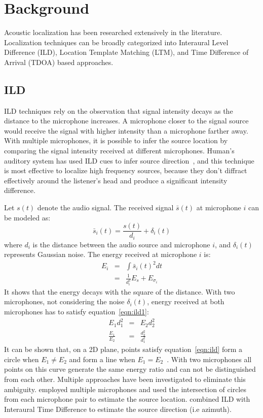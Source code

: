 \chapter{Background}
Acoustic localization has been researched extensively in the literature. Localization techniques can be broadly categorized into Interaural Level Difference (ILD), Location Template Matching (LTM), and Time Difference of Arrival (TDOA) based approaches.

\section{ILD}
ILD techniques rely on the observation that signal intensity decays as the distance to the microphone increases. A microphone closer to the signal source would receive the signal with higher intensity than a microphone farther away. With multiple microphones, it is possible to infer the source location by comparing the signal intensity received at different microphones. Human's auditory system has used ILD cues to infer source direction~\cite{ild:2}, and this technique is most effective to localize high frequency sources, because they don't diffract effectively around the listener's head and produce a significant intensity difference.

Let $s(t)$ denote the audio signal. The received signal $\bar s(t) $ at microphone $i$ can be modeled as:
\[
\bar s_i(t) = \frac{s(t)}{d_i} + \delta_i(t)
\]
where $d_i$ is the distance between the audio source and microphone $i$, and $\delta_i(t)$ represents Gaussian noise.
The energy received at microphone $i$ is:
\begin{eqnarray}
E_i & = & \int \bar s_i(t)^2 dt \\
\label{eqn:ild1}
& = & \frac{1}{d_i^2} E_s + E_{\sigma_i}
\end{eqnarray}
It shows that the energy decays with the square of the distance. With two microphones, not considering the noise $\delta_i(t)$, energy received at both microphones has to satisfy equation~\ref{eqn:ild1}:
\begin{eqnarray}
E_1d_1^2 &=& E_2d_2^2\\
\label{eqn:ild}
\frac{E_1}{E_2} &=& \frac{d_2^2}{d_1^2}
\end{eqnarray}
It can be shown that, on a 2D plane, points satisfy equation~\ref{eqn:ild} form a circle when $E_1 \ne E_2$ and form a line when $E_1 = E_2$~\cite{ild:1}. With two microphones all points on this curve generate the same energy ratio and can not be distinguished from each other. Multiple approaches have been investigated to eliminate this ambiguity. \cite{ild:1} employed multiple microphones and used the intersection of circles from each microphone pair to estimate the source location. \cite{ild:2} combined ILD with Interaural Time Difference to estimate the source direction (i.e azimuth).

